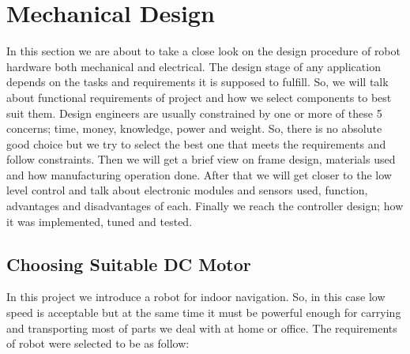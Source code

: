 \documentclass[12pt]{article}
\begin{document}
\section{Mechanical Design}
In this section we are about to take a close look on the design procedure of robot hardware both mechanical and electrical. The design stage of any application depends on the tasks and requirements it is supposed to fulfill. So, we will talk about functional requirements of project and how we select components to best suit them. Design engineers are usually constrained by one or more of these 5 concerns; time, money, knowledge, power and weight. So, there is no absolute good choice but we try to select the best one that meets the requirements and follow constraints. \cite{203} Then we will get a brief view on frame design, materials used and how manufacturing operation done. After that we will get closer to the low level control and talk about electronic modules and sensors used, function, advantages and disadvantages of each. Finally we reach the controller design; how it was implemented, tuned and tested.  

\subsection{Choosing Suitable DC Motor  \cite{203}}
In this project we introduce a robot for indoor navigation. So, in this case low speed is acceptable but at the same time it must be powerful enough for carrying and transporting most of parts we deal with at home or office. The requirements of robot were selected to be as follow:
\end{document}
